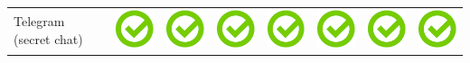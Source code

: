 \documentclass[10pt,foldmark,tumble]{leaflet}
\begin{document}
{\begin{tabular}{ L{2cm} | C{2cm} | C{2cm} | C{2cm} | C{2cm} | C{2cm} | C{2cm} | C{2cm} | }
Telegram (secret chat) & \includegraphics[scale=0.1]{pics/haken.png} & \includegraphics[scale=0.1]{pics/haken.png} & \includegraphics[scale=0.1]{pics/haken.png} & \includegraphics[scale=0.1]{pics/haken.png} & \includegraphics[scale=0.1]{pics/haken.png} & \includegraphics[scale=0.1]{pics/haken.png} & \includegraphics[scale=0.1]{pics/haken.png} \tabularnewline

\end{tabular}}
\end{document}
